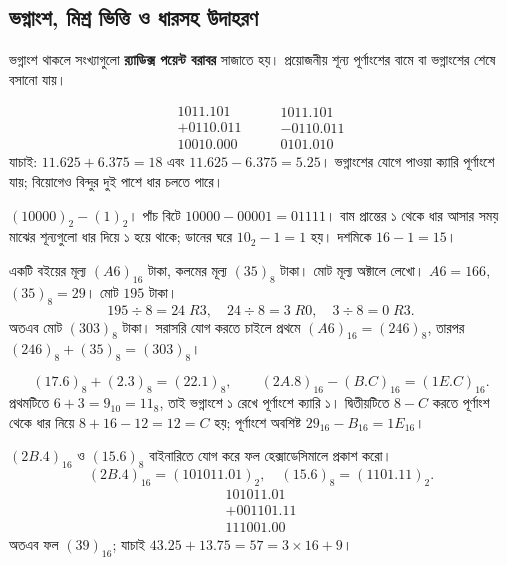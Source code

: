 \subsection{ভগ্নাংশ, মিশ্র ভিত্তি ও ধারসহ উদাহরণ}
ভগ্নাংশ থাকলে সংখ্যাগুলো \textbf{র‍্যাডিক্স পয়েন্ট বরাবর} সাজাতে হয়। প্রয়োজনীয় শূন্য পূর্ণাংশের বামে বা ভগ্নাংশের শেষে বসানো যায়।

\chThreeAnswer
\[\begin{array}{r}1011.101\\+0110.011\\\hline10010.000\end{array}
\qquad
\begin{array}{r}1011.101\\-0110.011\\\hline0101.010\end{array}\]
যাচাই: $11.625+6.375=18$ এবং $11.625-6.375=5.25$। ভগ্নাংশের যোগে পাওয়া ক্যারি পূর্ণাংশে যায়; বিয়োগেও বিন্দুর দুই পাশে ধার চলতে পারে।

$(10000)_2-(1)_2$।
\chThreeAnswer পাঁচ বিটে $10000-00001=01111$। বাম প্রান্তের ১ থেকে ধার আসার সময় মাঝের শূন্যগুলো ধার দিয়ে ১ হয়ে থাকে; ডানের ঘরে $10_2-1=1$ হয়। দশমিকে $16-1=15$।

একটি বইয়ের মূল্য $(A6)_{16}$ টাকা, কলমের মূল্য $(35)_8$ টাকা। মোট মূল্য অক্টালে লেখো।
\chThreeAnswer $A6=166$, $(35)_8=29$। মোট $195$ টাকা।
\[195\div8=24\;R3,\quad24\div8=3\;R0,\quad3\div8=0\;R3.\]
অতএব মোট $(303)_8$ টাকা। সরাসরি যোগ করতে চাইলে প্রথমে $(A6)_{16}=(246)_8$, তারপর $(246)_8+(35)_8=(303)_8$।

\chThreeAnswer
\[(17.6)_8+(2.3)_8=(22.1)_8,\qquad (2A.8)_{16}-(B.C)_{16}=(1E.C)_{16}.\]
প্রথমটিতে $6+3=9_{10}=11_8$, তাই ভগ্নাংশে ১ রেখে পূর্ণাংশে ক্যারি ১। দ্বিতীয়টিতে $8-C$ করতে পূর্ণাংশ থেকে ধার নিয়ে $8+16-12=12=C$ হয়; পূর্ণাংশে অবশিষ্ট $29_{16}-B_{16}=1E_{16}$।

$(2B.4)_{16}$ ও $(15.6)_8$ বাইনারিতে যোগ করে ফল হেক্সাডেসিমালে প্রকাশ করো।
\chThreeAnswer
\[(2B.4)_{16}=(101011.01)_2,\quad (15.6)_8=(1101.11)_2.\]
\[\begin{array}{r}101011.01\\+001101.11\\\hline111001.00\end{array}\]
অতএব ফল $(39)_{16}$; যাচাই $43.25+13.75=57=3\times16+9$।


